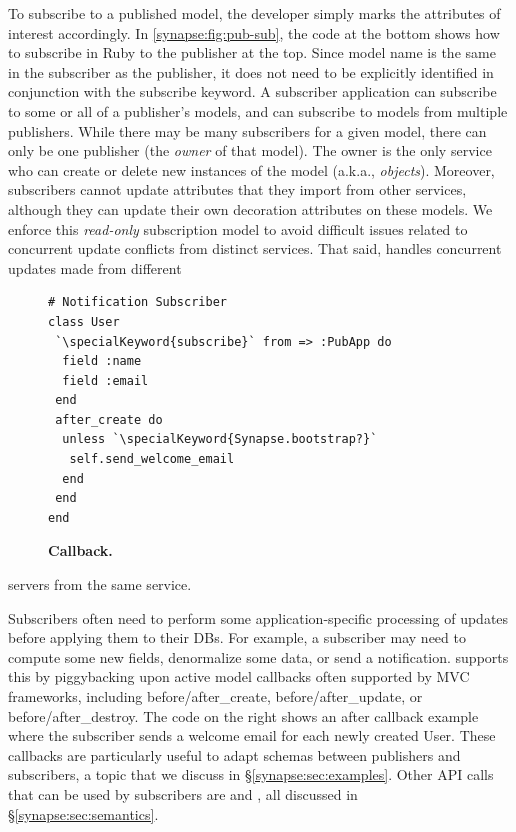 To subscribe to a published model, the developer simply marks the attributes of
interest accordingly.  In \F\ref{synapse:fig:pub-sub}, the code at the bottom
shows how to subscribe in Ruby to the publisher at the top.  Since
model name is the same in the subscriber as the publisher, it does not
need to be explicitly identified in conjunction with the 
{\code subscribe} keyword. 
A subscriber application can subscribe to some or all of a publisher's
models, and can subscribe to models from multiple publishers. While
there may be many subscribers for a given model, there can only be one
publisher (the {\em owner} of that model). The owner is the only
service who can create or delete new instances of the model (a.k.a.,
{\em objects}). Moreover, subscribers cannot update attributes that they
import from other services, although they can update their own
decoration attributes on these models. We enforce this {\em read-only}
subscription model to avoid difficult issues related to concurrent update
conflicts from distinct services.
That said, \synapse handles concurrent updates made from different
\begin{figure}
\vspace{-0.2cm}
\begin{minipage}{.2\textwidth}
\begin{lstlisting}[xleftmargin=2pt,framexleftmargin=2pt]
# Notification Subscriber
class User
 `\specialKeyword{subscribe}` from => :PubApp do
  field :name
  field :email
 end
 after_create do
  unless `\specialKeyword{Synapse.bootstrap?}`
   self.send_welcome_email
  end
 end
end
\end{lstlisting}
\end{minipage}
\vspace{-0.5cm}
\caption{{\footnotesize {\bf Callback.}}}
\label{synapse:fig:welcome-email}
\vspace{-5pt}
\end{figure}
\noindent
servers from the same service.

Subscribers often need to perform some
application-specific processing of updates before applying them to their
DBs. For example, a subscriber may need to compute some new fields,
denormalize some data, or send a notification.  \synapse supports this by
piggybacking upon active model callbacks often supported by MVC frameworks,
including {\code \small before/after\_create}, {\code \small before/after\_update}, or
{\code \small  before/after\_destroy}.
The code on the right shows an after callback example where the subscriber
sends a welcome email for each newly created User.
These callbacks are particularly useful to adapt schemas
between publishers and subscribers, a topic that we discuss in
\S\ref{synapse:sec:examples}.  Other API calls that can be used by subscribers are
{} and {}, all
discussed in \S\ref{synapse:sec:semantics}.  

